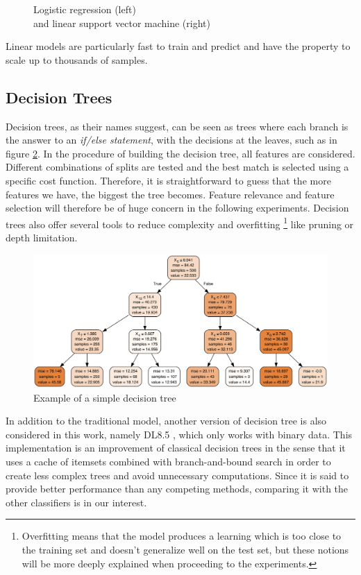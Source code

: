 \begin{figure}[ht]
\begin{minipage}[b]{0.52\linewidth}
\end{minipage}
\captionsetup{justification=centering}
\caption{Logistic regression (left) \cite{logreg1} \\ and linear support vector machine (right) \cite{logreg2}}
\label{fig:LM}
\end{figure}

Linear models are particularly fast to train and predict and have the property to scale up to thousands of samples.

\subsection{Decision Trees}

Decision trees, as their names suggest, can be seen as trees where each branch is the answer to an \textit{if/else statement}, with the decisions at the leaves, such as in figure \ref{fig:DT}. In the procedure of building the decision tree, all features are considered. Different combinations of splits are tested and the best match is selected using a specific cost function. Therefore, it is    straightforward to guess that the more features we have, the biggest the tree becomes. Feature relevance and feature selection will therefore be of huge concern in the following experiments. Decision trees also offer several tools to reduce complexity and overfitting \footnote{Overfitting means that the model produces a learning which is too close to the training set and doesn't generalize well on the test set, but these notions will be more deeply explained when proceeding to the experiments.} like pruning or depth limitation.

\begin{figure}[!ht]
  \includegraphics[width=\linewidth]{Figures/DT.png}
  \caption{Example of a simple decision tree \cite{dt_source}}
  \label{fig:DT}
\end{figure}

In addition to the traditional model, another version of decision tree is also considered in this work, namely DL8.5 \cite{DL8.5}, which only works with binary data. This implementation is an improvement of classical decision trees in the sense that it uses a cache of itemsets combined with branch-and-bound search in order to create less complex trees and avoid unnecessary computations. Since it is said to provide better performance than any competing methods, comparing it with the other classifiers is in our interest.

